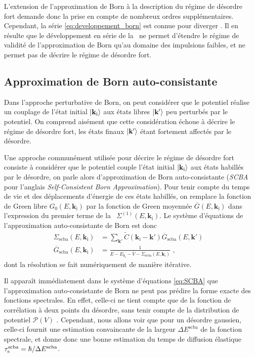 L'extension de l'approximation de Born à la description du régime de désordre fort demande donc la prise en compte de nombreux ordres supplémentaires. Cependant, la série \ref{eq:developpement_born} est connue pour diverger \citep{kuhn2007coherent}. Il en résulte que le développement en série de la \selfenergy\ ne permet d'étendre le régime de validité de l'approximation de Born qu'au domaine des impulsions faibles, et ne permet pas de décrire le régime de désordre fort.


\subsection{Approximation de Born auto-consistante}
Dans l'approche perturbative de Born, on peut considérer que le potentiel réalise un couplage de l'état initial $\left| \mathbf{k}_{\mathrm{i}} \right\rangle$ aux états libres $\left| \mathbf{k}' \right\rangle$ peu perturbés par le potentiel. On comprend aisément que cette considération échoue à décrire le régime de désordre fort, les états finaux $\left| \mathbf{k}' \right\rangle$ étant fortement affectés par le désordre. 

Une approche communément utilisée pour décrire le régime de désordre fort consiste à considérer que le potentiel couple l'état initial $\left| \mathbf{k}_{\mathrm{i}} \right\rangle$ aux états habillés par le désordre, on parle alors d'approximation de Born auto-consistante (\emph{SCBA} pour l'anglais \emph{Self-Consistent Born Approximation}). Pour tenir compte du temps de vie et des déplacements d'énergie de ces états habillés, on remplace la fonction de Green libre $G_0(E,\mathbf{k}_{\mathrm{i}})$ par la fonction de Green moyennée $\overline{G}(E,\mathbf{k}_{\mathrm{i}})$ dans l'expression du premier terme de la \selfenergy\ $\Sigma^{(1)}(E,\mathbf{k}_{\mathrm{i}})$. Le système d'équations de l'approximation auto-consistante de Born est donc
\begin{align}
\Sigma_{\mathrm{scba}}(E,\mathbf{k}_{\mathrm{i}})&=\sum_{\mathbf{k}'}{\widetilde{C}(\mathbf{k}_{\mathrm{i}}-\mathbf{k}') \overline{G}_{\mathrm{scba}}(E,\mathbf{k}')}  
\label{eq:SCBA}\\
\overline{G}_{\mathrm{scba}}(E,\mathbf{k}_{\mathrm{i}}) &= \frac{1}{E-E_{\mathrm{k}_i} - \overline{V} - \Sigma_{\mathrm{scba}}(E,\mathbf{k}_{\mathrm{i}})} \text{ ,}
\end{align}
dont la résolution se fait numériquement de manière itérative.

Il apparaît immédiatement dans le système d'équations \ref{eq:SCBA} que l'approximation auto-consistante de Born ne peut pas prédire la forme exacte des fonctions spectrales. En effet, celle-ci ne tient compte que de la fonction de corrélation à deux points du désordre, sans tenir compte de la distribution de potentiel $\mathcal{P}(V)$ \citep{pasek2015phase}. Cependant, nous allons voir que pour un désordre gaussien, celle-ci fournit une estimation convaincante de la largeur $\Delta E^{\mathrm{scba}}$ de la fonction spectrale, et donne donc une bonne estimation du temps de diffusion élastique $\tau_{\mathrm{s}}^{\mathrm{scba}}=\hslash/\Delta E^{\mathrm{scba}}$. 

